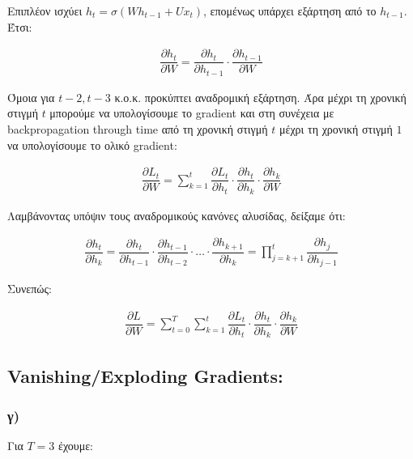 \documentclass[12pt,a4paper]{article}
\begin{document}
				Επιπλέον ισχύει \( h_t = \sigma(Wh_{t-1} + Ux_t) \), επομένως υπάρχει εξάρτηση από το \( h_{t-1} \). Έτσι:
				
				\begin{align*}
					\dfrac{\partial h_t}{\partial W} = \dfrac{\partial h_t}{\partial h_{t-1}} \cdot \dfrac{\partial h_{t-1}}{\partial W}
				\end{align*}
				
				Όμοια για $t-2, t-3$ κ.ο.κ. προκύπτει αναδρομική εξάρτηση. Άρα μέχρι τη χρονική στιγμή $t$ μπορούμε να υπολογίσουμε το gradient και στη συνέχεια με backpropagation through time από τη χρονική στιγμή $t$ μέχρι τη χρονική στιγμή $1$ να υπολογίσουμε το ολικό gradient:
				
				\begin{align*}
					\dfrac{\partial L_t}{\partial W} = \sum_{k=1}^{t} \dfrac{\partial L_t}{\partial h_t} \cdot \dfrac{\partial h_t}{\partial h_k} \cdot \dfrac{\partial h_k}{\partial W}
				\end{align*}
				
				Λαμβάνοντας υπόψιν τους αναδρομικούς κανόνες αλυσίδας, δείξαμε ότι:
				
				\begin{align*}
					\dfrac{\partial h_t}{\partial h_k} = \dfrac{\partial h_t}{\partial h_{t-1}} \cdot \dfrac{\partial h_{t-1}}{\partial h_{t-2}} \cdot \ldots \cdot \dfrac{\partial h_{k+1}}{\partial h_k} = \prod_{j=k+1}^{t} \dfrac{\partial h_j}{\partial h_{j-1}}
				\end{align*}
				
				Συνεπώς:
				
				\begin{align*}
					\dfrac{\partial L}{\partial W} = \sum_{t=0}^{T} \sum_{k=1}^{t} \dfrac{\partial L_t}{\partial h_t} \cdot \dfrac{\partial h_t}{\partial h_k} \cdot \dfrac{\partial h_k}{\partial W}
				\end{align*}
			
		\subsection*{Vanishing/Exploding Gradients:}
		
			\subsubsection*{γ)}
				Για $T = 3$ έχουμε: 
				
\end{document}
